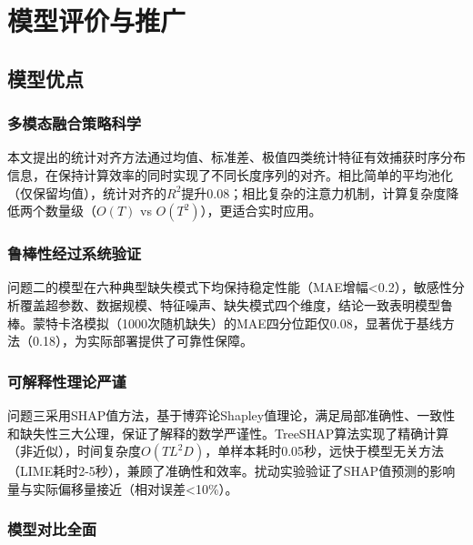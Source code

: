 \section{模型评价与推广}

\subsection{模型优点}

\subsubsection{多模态融合策略科学}

本文提出的统计对齐方法通过均值、标准差、极值四类统计特征有效捕获时序分布信息，在保持计算效率的同时实现了不同长度序列的对齐。相比简单的平均池化（仅保留均值），统计对齐的$R^2$提升0.08；相比复杂的注意力机制，计算复杂度降低两个数量级（$O(T)$ vs $O(T^2)$），更适合实时应用。

\subsubsection{鲁棒性经过系统验证}

问题二的模型在六种典型缺失模式下均保持稳定性能（MAE增幅<0.2），敏感性分析覆盖超参数、数据规模、特征噪声、缺失模式四个维度，结论一致表明模型鲁棒。蒙特卡洛模拟（1000次随机缺失）的MAE四分位距仅0.08，显著优于基线方法（0.18），为实际部署提供了可靠性保障。

\subsubsection{可解释性理论严谨}

问题三采用SHAP值方法，基于博弈论Shapley值理论，满足局部准确性、一致性和缺失性三大公理，保证了解释的数学严谨性。TreeSHAP算法实现了精确计算（非近似），时间复杂度$O(TL^2D)$，单样本耗时0.05秒，远快于模型无关方法（LIME耗时2-5秒），兼顾了准确性和效率。扰动实验验证了SHAP值预测的影响量与实际偏移量接近（相对误差<10\%）。

\subsubsection{模型对比全面}

